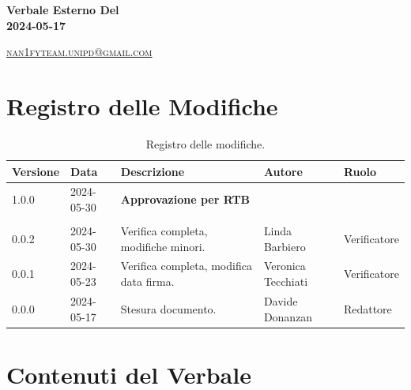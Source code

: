 \documentclass[8pt]{article}
\begin{document}
\begin{titlepage}
\begin{minipage}[t]{0.47\textwidth}
{		}
		\vspace{4mm}\vspace{4mm}
	\end{minipage}
	\vspace{4cm}
	\begin{center}
		\begin{flushright}
			{\fontsize{30pt}{52pt}\selectfont \textbf{Verbale Esterno Del\\2024-05-17\\}} %
		\end{flushright}
		\vspace{3cm}
	\end{center}
	\vspace{8.5 cm}
	{\small \textsc{\href{mailto: nan1fyteam.unipd@gmail.com}{nan1fyteam.unipd@gmail.com}}}
\end{titlepage}

\pagestyle{mystyle}
\section*{Registro delle Modifiche}
\begin{table}[ht!]	
	\centering
	\begin{tabular}{p{1.2cm} p{2cm} p{6cm} p{3cm} p{2cm}}
		\toprule
		\textbf{Versione}& \textbf{Data} & \textbf{Descrizione} & \textbf{Autore} & \textbf{Ruolo} \\
		\midrule
		1.0.0 & 2024-05-30 & \textbf{Approvazione per RTB} & & \\\\
		0.0.2 & 2024-05-30 & Verifica completa, modifiche minori. & Linda Barbiero & Verificatore \\
		0.0.1 & 2024-05-23 & Verifica completa, modifica data firma. & Veronica Tecchiati & Verificatore \\
        0.0.0 & 2024-05-17 & Stesura documento. & Davide Donanzan & Redattore \\
		\bottomrule
	\end{tabular}
	\caption{Registro delle modifiche.}
	\label{table:Registro delle modifiche}
\end{table}
\newpage
\tableofcontents
\clearpage
\newpage
\justifying
\section{Contenuti del Verbale}
\end{document}
